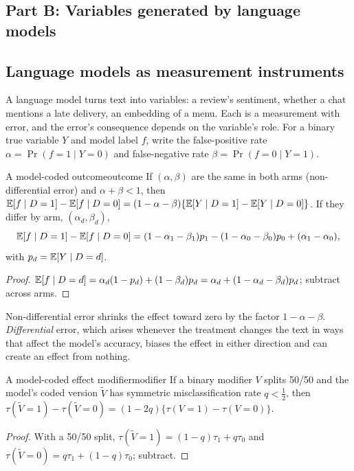 \documentclass[11pt]{article}
\begin{document}
\subsection*{Part B: Variables generated by language models}

\subsection{Language models as measurement instruments}

A language model turns text into variables: a review's sentiment, whether a chat mentions a late delivery, an embedding of a menu.
Each is a measurement with error, and the error's consequence depends on the variable's role. For a binary true variable $Y$ and model
label $f$, write the false-positive rate $\alpha = \Pr(f=1 \mid Y=0)$ and false-negative rate $\beta = \Pr(f=0 \mid Y=1)$.

\begin{prop}{A model-coded outcome}{outcome}
If $(\alpha, \beta)$ are the same in both arms (non-differential error) and $\alpha + \beta < 1$, then
$\mathbb{E}[f \mid D=1] - \mathbb{E}[f \mid D=0] = (1 - \alpha - \beta)\{\mathbb{E}[Y \mid D=1] - \mathbb{E}[Y \mid D=0]\}$. If they differ by arm, $(\alpha_d, \beta_d)$,
\[
  \mathbb{E}[f \mid D=1] - \mathbb{E}[f \mid D=0] = (1-\alpha_1-\beta_1)p_1 - (1-\alpha_0-\beta_0)p_0 + (\alpha_1 - \alpha_0),
\]
with $p_d = \mathbb{E}[Y \mid D=d]$.
\end{prop}
\begin{proof}
$\mathbb{E}[f \mid D=d] = \alpha_d(1 - p_d) + (1 - \beta_d)p_d = \alpha_d + (1 - \alpha_d - \beta_d)p_d$; subtract across arms.
\end{proof}

Non-differential error shrinks the effect toward zero by the factor $1 - \alpha - \beta$. \emph{Differential} error, which arises whenever
the treatment changes the text in ways that affect the model's accuracy, biases the effect in either direction and can create an effect
from nothing.

\begin{prop}{A model-coded effect modifier}{modifier}
If a binary modifier $V$ splits 50/50 and the model's coded version $\tilde V$ has symmetric misclassification rate $q < \tfrac12$, then
$\tau(\tilde V = 1) - \tau(\tilde V = 0) = (1 - 2q)\{\tau(V = 1) - \tau(V = 0)\}$.
\end{prop}
\begin{proof}
With a 50/50 split, $\tau(\tilde V = 1) = (1-q)\tau_1 + q\tau_0$ and $\tau(\tilde V = 0) = q\tau_1 + (1-q)\tau_0$; subtract.
\end{proof}
\end{document}
